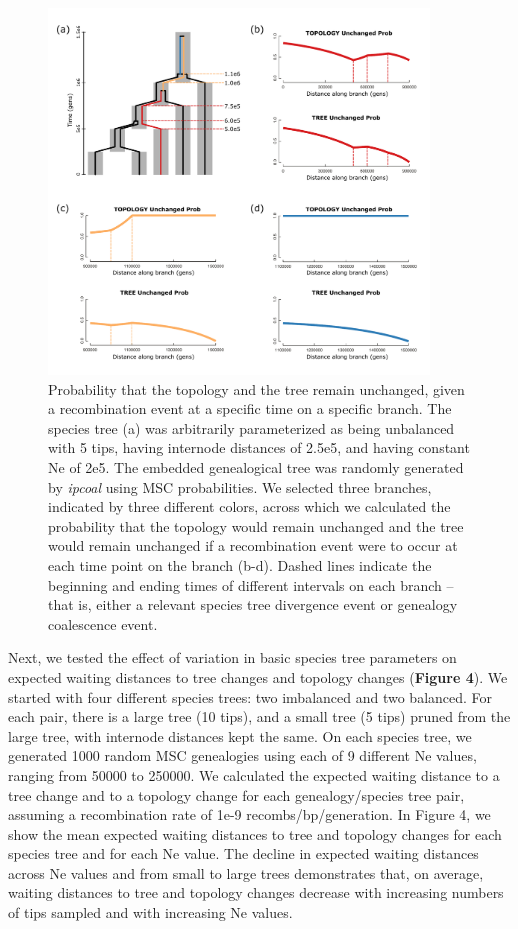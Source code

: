 \documentclass[11pt]{article}
\begin{document}
\begin{figure}
	\centering
	\includegraphics[width=0.9\textwidth]{figures/Fig4-bt_prob.pdf}
	\caption{Probability that the topology and the tree remain unchanged, given a recombination event at a specific time on a specific branch. The species tree (a) was arbitrarily parameterized as being unbalanced with 5 tips, having internode distances of 2.5e5, and having constant Ne of 2e5. The embedded genealogical tree was randomly generated by \emph{ipcoal} using MSC probabilities. We selected three branches, indicated by three different colors, across which we calculated the probability that the topology would remain unchanged and the tree would remain unchanged if a recombination event were to occur at each time point on the branch (b-d). Dashed lines indicate the beginning and ending times of different intervals on each branch -- that is, either a relevant species tree divergence event or genealogy coalescence event.}
\end{figure}

Next, we tested the effect of variation in basic species tree parameters on expected waiting distances to tree changes and topology changes (\textbf{Figure 4}). We started with four different species trees: two imbalanced and two balanced. For each pair, there is a large tree (10 tips), and a small tree (5 tips) pruned from the large tree, with internode distances kept the same. On each species tree, we generated 1000 random MSC genealogies using each of 9 different Ne values, ranging from 50000 to 250000. We calculated the expected waiting distance to a tree change and to a topology change for each genealogy/species tree pair, assuming a recombination rate of 1e-9 recombs/bp/generation. In Figure 4, we show the mean expected waiting distances to tree and topology changes for each species tree and for each Ne value. The decline in expected waiting distances across Ne values and from small to large trees demonstrates that, on average, waiting distances to tree and topology changes decrease with increasing numbers of tips sampled and with increasing Ne values. 
\end{document}
